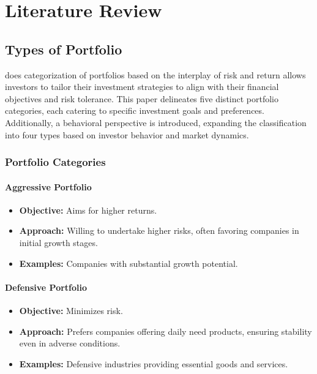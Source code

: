 \chapter{Literature Review}
\label{mathchapter}

\section{Types of Portfolio}


\cite{Gunjan2023} does categorization of portfolios based on the interplay of risk and return allows investors to tailor their investment strategies to align with their financial objectives and risk tolerance. This paper delineates five distinct portfolio categories, each catering to specific investment goals and preferences. Additionally, a behavioral perspective is introduced, expanding the classification into four types based on investor behavior and market dynamics.

\subsection{Portfolio Categories}

\subsubsection{Aggressive Portfolio}
\begin{itemize}
    \item \textbf{Objective:} Aims for higher returns.
    \item \textbf{Approach:} Willing to undertake higher risks, often favoring companies in initial growth stages.
    \item \textbf{Examples:} Companies with substantial growth potential.
\end{itemize}

\subsubsection{Defensive Portfolio}
\begin{itemize}
    \item \textbf{Objective:} Minimizes risk.
    \item \textbf{Approach:} Prefers companies offering daily need products, ensuring stability even in adverse conditions.
    \item \textbf{Examples:} Defensive industries providing essential goods and services.
\end{itemize}


